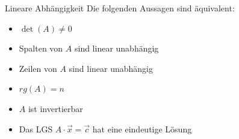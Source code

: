 \begin{theorem}{Lineare Abhängigkeit}
    Die folgenden Aussagen sind äquivalent:
    \vspace*{2mm}
    \begin{itemize}
    \item $\operatorname{det}(A) \neq 0$
    \item Spalten von $A$ sind linear unabhängig
    \item Zeilen von $A$ sind linear unabhängig
    \item $r g(A)=n$
    \item $A$ ist invertierbar
    \item Das LGS $A \cdot \vec{x}=\vec{c}$ hat eine eindeutige Lösung
    \end{itemize}
\end{theorem}

